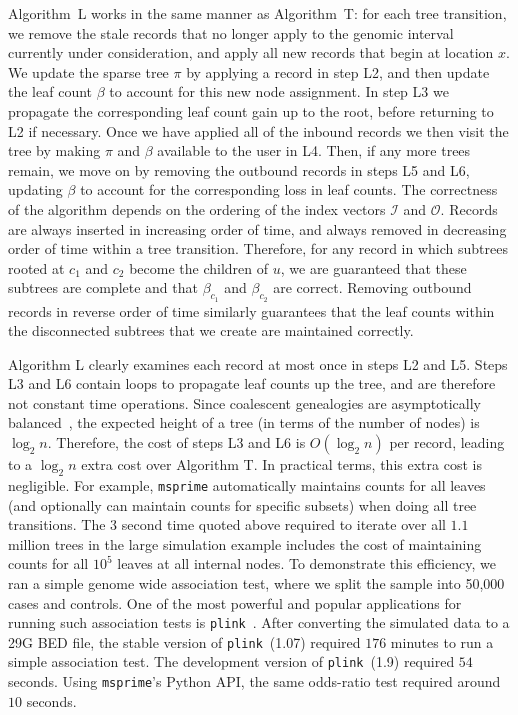 \documentclass[10pt]{article}
\newcommand{\indexin}[0]{\ensuremath{\mathcal{I}}}
\newcommand{\indexout}[0]{\ensuremath{\mathcal{O}}}
\newcommand{\msprime}[0]{\texttt{msprime}}
\newcommand{\plink}[0]{\texttt{plink}}
\begin{document}
Algorithm~L works in the same manner as Algorithm~T: for each tree transition,
we remove the stale records that no longer apply to the genomic interval
currently under consideration, and apply all new records that begin at location
$x$. We update the sparse tree $\pi$ by applying a record in step L2, and then
update the leaf count $\beta$ to account for this new node assignment. In step
L3 we propagate the corresponding leaf count gain up to the root, before
returning to L2 if necessary. Once we have applied all of the inbound records
we then visit the tree by making $\pi$ and $\beta$ available to the user in L4.
Then, if any more trees remain, we move on by removing the outbound records in
steps L5 and L6, updating $\beta$ to account for the corresponding loss in leaf
counts. The correctness of the algorithm depends on the ordering of the index
vectors $\indexin$ and $\indexout$. Records are always inserted in increasing
order of time, and always removed in decreasing order of time within a tree
transition. Therefore, for any record in which subtrees rooted at $c_1$ and
$c_2$ become the children of $u$, we are guaranteed that these subtrees are
complete and that $\beta_{c_1}$ and $\beta_{c_2}$ are correct. Removing
outbound records in reverse order of time similarly guarantees that the leaf
counts within the disconnected subtrees that we create are maintained
correctly.

Algorithm L clearly examines each record at most once in steps L2 and L5. Steps
L3 and L6 contain loops to propagate leaf counts up the tree, and are therefore
not constant time operations. Since coalescent genealogies are asymptotically
balanced~\citep{lw13}, the expected height of a tree (in terms of the number of
nodes) is $\log_2 n$. Therefore, the cost of steps L3 and L6 is $O(\log_2 n)$
per record, leading to a $\log_2 n$ extra cost over Algorithm T. In practical
terms, this extra cost is negligible. For example, \texttt{msprime}
automatically maintains counts for all leaves (and optionally can maintain
counts for specific subsets) when doing all tree transitions. The $3$ second
time quoted above required to iterate over all $1.1$ million trees in the large
simulation example includes the cost of maintaining counts for all $10^5$
leaves at all internal nodes. To demonstrate this efficiency, we ran a simple
genome wide association test, where we split the sample into 50,000 cases and
controls. One of the most powerful and popular applications for running such
association tests is \plink~\citep{pnbt07}. After converting the simulated data
to a 29G BED file, the stable version of \plink\ (1.07) required $176$ minutes
to run a simple association test. The development version of \plink\ (1.9)
required $54$ seconds. Using \msprime's Python API, the same odds-ratio test
required around $10$ seconds.
\end{document}
